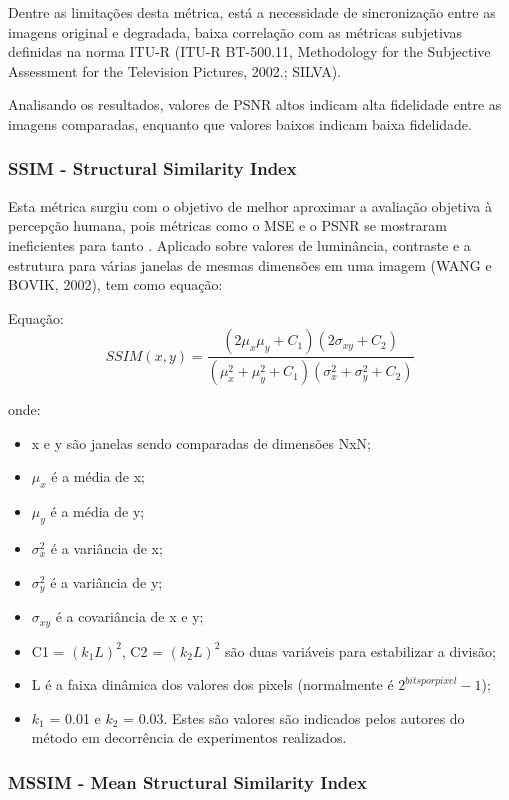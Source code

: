 Dentre as limitações desta métrica, está a necessidade de sincronização entre as imagens original e degradada, baixa correlação com as métricas subjetivas definidas na norma ITU-R (ITU-R BT-500.11, Methodology for the Subjective Assessment for the Television Pictures, 2002.; SILVA).

Analisando os resultados, valores de PSNR altos indicam alta fidelidade entre as imagens comparadas, enquanto que valores baixos indicam baixa fidelidade.

\subsubsection{SSIM - Structural Similarity Index}

Esta métrica surgiu com o objetivo de melhor aproximar a avaliação objetiva à percepção humana, pois métricas como o MSE e o PSNR se mostraram ineficientes para tanto \cite{emmersonsilva}. Aplicado sobre valores de luminância, contraste e a estrutura para várias janelas de mesmas dimensões em uma imagem (WANG e BOVIK, 2002), tem como equação:

    Equação: \[SSIM(x, y) = \frac{(2\mu_{x}\mu_{y} + C_{1})(2\sigma_{xy} + C_{2})} {(\mu_{x}^{2} + \mu_{y}^{2}+C_{1})(\sigma_{x}^{2} + \sigma_{y}^{2}+C_{2})}\]

onde:
\begin{itemize}
	\item x e y são janelas sendo comparadas de dimensões NxN;
	\item \(\mu_{x}\) é a média de x;
    \item \(\mu_{y}\) é  a média de y;
    \item \(\sigma^{2}_{x}\) é a variância de x;
    \item \(\sigma^{2}_{y}\) é a variância de y;
    \item \(\sigma_{xy}\) é a covariância de x e y;
    \item C1 = \((k_{1}L)^{2}\), C2 = \((k_{2}L)^{2}\) são duas variáveis para estabilizar a divisão;
    \item L é a faixa dinâmica dos valores dos pixels (normalmente é \(2^{bits por pixel} - 1\));
    \item \(k_{1}\) = 0.01 e \(k_{2}\) = 0.03. Estes são valores são indicados pelos autores do método \cite{wangbovik2004} em decorrência de experimentos realizados.
\end{itemize}

\subsubsection{MSSIM - Mean Structural Similarity Index}


